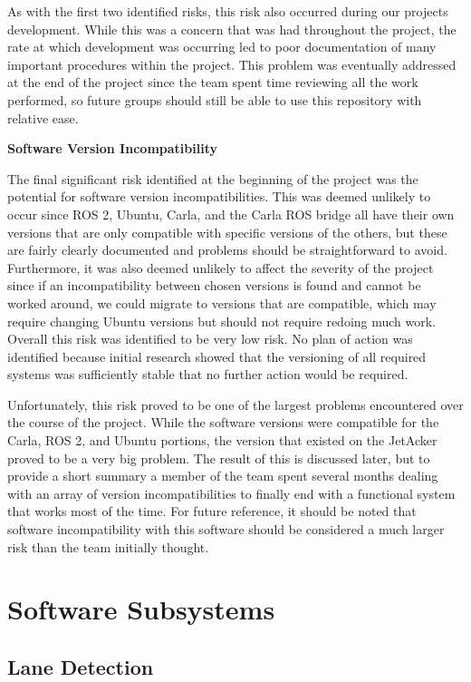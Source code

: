 \documentclass[titlepage,draft]{article}
\begin{document}
As with the first two identified risks, this risk also occurred during our projects development. While this was a concern that was had throughout the project, the rate at which development was occurring led to poor documentation of many important procedures within the project. This problem was eventually addressed at the end of the project since the team spent time reviewing all the work performed, so future groups should still be able to use this repository with relative ease.

\textbf{Software Version Incompatibility}

The final significant risk identified at the beginning of the project was the potential for software version incompatibilities. This was deemed unlikely to occur since ROS 2, Ubuntu, Carla, and the Carla ROS bridge all have their own versions that are only compatible with specific versions of the others, but these are fairly clearly documented and problems should be straightforward to avoid. Furthermore, it was also deemed unlikely to affect the severity of the project since if an incompatibility between chosen versions is found and cannot be worked around, we could migrate to versions that are compatible, which may require changing Ubuntu versions but should not require redoing much work. Overall this risk was identified to be very low risk. No plan of action was identified because initial research showed that the versioning of all required systems was sufficiently stable that no further action would be required.

Unfortunately, this risk proved to be one of the largest problems encountered over the course of the project. While the software versions were compatible for the Carla, ROS 2, and Ubuntu portions, the version that existed on the JetAcker proved to be a very big problem. The result of this is discussed later, but to provide a short summary a member of the team spent several months dealing with an array of version incompatibilities to finally end with a functional system that works most of the time. For future reference, it should be noted that software incompatibility with this software should be considered a much larger risk than the team initially thought.


\section{Software Subsystems}

\subsection{Lane Detection}
\end{document}
